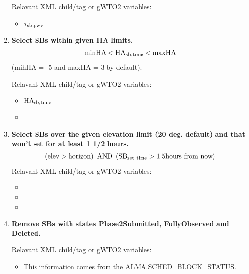 \documentclass[a4paper,10pt,english]{sphinxmanual}
\begin{document}
\begin{enumerate}
Relavant XML child/tag or gWTO2 variables:
\begin{itemize}
\item {} 
\(\tau_{\rm{sb,pwv}}\)

\end{itemize}

\item {} 
\textbf{Select SBs within given HA limits.}
\begin{gather}
\begin{split}\rm{minHA} < \rm{HA}_{sb,time} < \rm{maxHA}\end{split}\notag
\end{gather}
(mihHA = -5 and maxHA =  3 by default).

Relavant XML child/tag or gWTO2 variables:
\begin{itemize}
\item {} 
\(\rm{HA}_{sb,time}\)

\item {} 

\end{itemize}

\item {} 
\textbf{Select SBs over the given elevation limit (20 deg. default) and that won't}
\textbf{set for at least 1 1/2 hours.}
\begin{gather}
\begin{split}\left( \rm{elev} > \rm{horizon} \right) \rm{\ AND\ } \left(
\rm{SB}_{\rm{set\ time}} > 1.5\rm{hours\ from\ now} \right)\end{split}\notag
\end{gather}
Relavant XML child/tag or gWTO2 variables:
\begin{itemize}
\item {} 

\item {} 

\item {} 

\end{itemize}

\item {} 
\textbf{Remove SBs with states Phase2Submitted, FullyObserved and Deleted.}

Relavant XML child/tag or gWTO2 variables:
\begin{itemize}
\item {} 
This information comes from the ALMA.SCHED\_BLOCK\_STATUS.

\end{itemize}


\end{enumerate}
\end{document}
